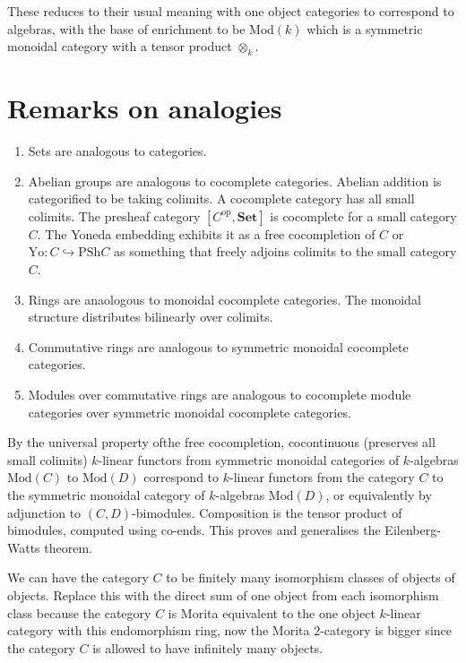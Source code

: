 \documentclass{tufte-book}
\begin{document}
These reduces to their usual meaning with one object categories to correspond to algebras, with the base of enrichment to be $\mathrm{Mod}(k)$ which is a symmetric monoidal category with a tensor product $\otimes_k$.

\section{Remarks on analogies}

\begin{enumerate}
	\item Sets are analogous to categories.
	\item Abelian groups are analogous to cocomplete categories. Abelian addition is categorified to be taking colimits. A cocomplete category has all small colimits. The presheaf category $[C^\mathrm{op}, \mathbf{Set}]$ is cocomplete for a small category $C$. The Yoneda embedding exhibits it as a free cocompletion of $C$ or $\mathrm{Yo} : C \hookrightarrow \mathrm{PSh}C$ as something that freely adjoins colimits to the small category $C$. 
	\item Rings are anaologous to monoidal cocomplete categories. The monoidal structure distributes bilinearly over colimits.
	\item Commutative rings are analogous to symmetric monoidal cocomplete categories.
	\item Modules over commutative rings are analogous to cocomplete module categories over symmetric monoidal cocomplete categories.
\end{enumerate}

By the universal property ofthe free cocompletion, cocontinuous (preserves all small colimits) $k$-linear functors from symmetric monoidal categories of $k$-algebras $\mathrm{Mod}(C)$ to $\mathrm{Mod}(D)$ correspond to $k$-linear functors from the category $C$ to the symmetric monoidal category of $k$-algebras $\mathrm{Mod}(D)$, or equivalently by adjunction to $(C,D)$-bimodules. Composition is the tensor product of bimodules, computed using co-ends. This proves and generalises the Eilenberg-Watts theorem.

We can have the category $C$ to be finitely many isomorphism classes of objects of objects. Replace this with the direct sum of one object from each isomorphism class because the category $C$ is Morita equivalent to the one object $k$-linear category with this endomorphism ring, now the Morita $2$-category is bigger since the category $C$ is allowed to have infinitely many objects.
\end{document}
